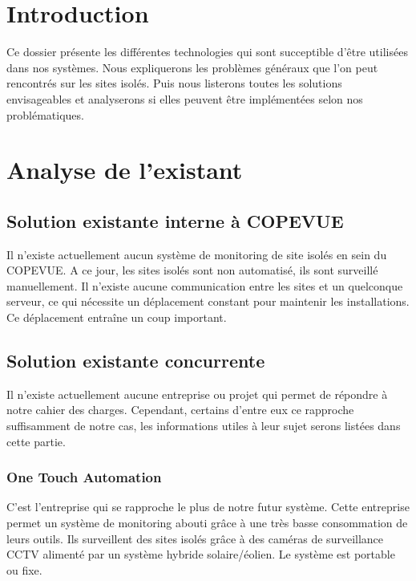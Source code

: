 \section{Introduction}

Ce dossier présente les différentes technologies qui sont succeptible d’être utilisées dans nos systèmes. Nous expliquerons les problèmes généraux que l’on peut rencontrés sur les sites isolés. Puis nous listerons toutes les solutions envisageables et analyserons si elles peuvent être implémentées selon nos problématiques.

\section{Analyse de l'existant}

\subsection{Solution existante interne à COPEVUE}

Il n’existe actuellement aucun système de monitoring de site isolés en sein du COPEVUE. A ce jour, les sites isolés sont non automatisé, ils sont surveillé manuellement. Il n’existe aucune communication entre les sites et un quelconque serveur, ce qui nécessite un déplacement constant pour maintenir les installations. Ce déplacement entraîne un coup important.

\subsection{Solution existante concurrente}

Il n’existe actuellement aucune entreprise ou projet qui permet de répondre à notre cahier des charges. Cependant, certains d’entre eux ce rapproche suffisamment de notre cas, les informations utiles à leur sujet serons listées dans cette partie.

\subsubsection{One Touch Automation}

C’est l’entreprise qui se rapproche le plus de notre futur système.
Cette entreprise permet un système de monitoring abouti grâce à une très basse consommation de leurs outils. Ils surveillent des sites isolés grâce à des caméras de surveillance CCTV alimenté par un système hybride solaire/éolien. Le système est portable ou fixe.

